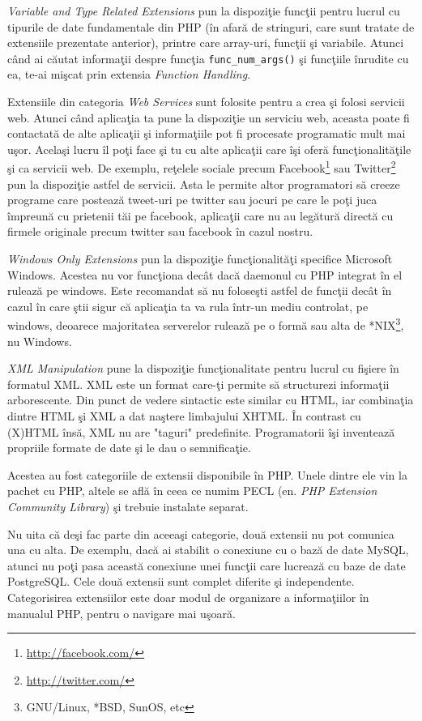 \textit{Variable and Type Related Extensions} pun
la dispoziţie funcţii pentru lucrul cu tipurile
de date fundamentale din PHP (în afară de stringuri,
care sunt tratate de extensiile prezentate anterior), printre
care array-uri, funcţii şi variabile. Atunci când ai căutat
informaţii despre funcţia \texttt{func\_num\_args()}
şi funcţiile înrudite cu ea, te-ai mişcat prin extensia
\textit{Function Handling}.

Extensiile din categoria \textit{Web Services} sunt folosite
pentru a crea şi folosi servicii web. Atunci când aplicaţia
ta pune la dispoziţie un serviciu web, aceasta poate
fi contactată de alte aplicaţii şi informaţiile pot
fi procesate programatic mult mai uşor. Acelaşi lucru îl
poţi face şi tu cu alte aplicaţii care îşi oferă
funcţionalităţile şi ca servicii web. De exemplu,
reţelele sociale precum Facebook\footnote{\url{http://facebook.com/}}
sau Twitter\footnote{\url{http://twitter.com/}} pun la dispoziţie
astfel de servicii. Asta le permite altor programatori să
creeze programe care postează tweet-uri pe twitter sau
jocuri pe care le poţi juca împreună cu prietenii tăi
pe facebook, aplicaţii care nu au legătură directă
cu firmele originale precum twitter sau facebook în
cazul nostru.

\textit{Windows Only Extensions} pun la dispoziţie funcţionalităţi
specifice Microsoft Windows. Acestea nu vor funcţiona decât dacă
daemonul cu PHP integrat în el rulează pe windows.
Este recomandat să nu foloseşti astfel de funcţii
decât în cazul în care ştii sigur că aplicaţia ta
va rula într-un mediu controlat, pe windows, deoarece
majoritatea serverelor rulează pe o formă sau alta
de *NIX\footnote{GNU/Linux, *BSD, SunOS, etc}, nu Windows.

\textit{XML Manipulation} pune la dispoziţie funcţionalitate
pentru lucrul cu fişiere în formatul XML. XML este un format
care-ţi permite să structurezi informaţii arborescente. Din punct
de vedere sintactic este
similar cu HTML, iar combinaţia dintre HTML şi XML a dat naştere
limbajului XHTML. În contrast cu (X)HTML însă, XML nu are
"taguri" predefinite. Programatorii îşi inventează
propriile formate de date şi le dau o semnificaţie.

Acestea au fost categoriile de extensii disponibile în PHP.
Unele dintre ele vin la pachet cu PHP, altele se află
în ceea ce numim PECL (en. \textsl{PHP Extension Community Library})
şi trebuie instalate separat.

Nu uita că deşi fac parte din aceeaşi categorie, două extensii nu
pot comunica una cu alta. De exemplu, dacă ai stabilit o conexiune
cu o bază de date MySQL, atunci nu poţi pasa această conexiune
unei funcţii care lucrează cu baze de date PostgreSQL. Cele două
extensii sunt complet diferite şi independente. Categorisirea
extensiilor este doar modul de organizare a informaţiilor în
manualul PHP, pentru o navigare mai uşoară.


